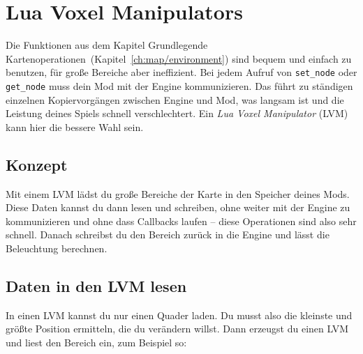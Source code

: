 \chapter{Lua Voxel Manipulators}
\label{ch:advmap/lvm}

Die Funktionen aus dem Kapitel Grundlegende
Kartenoperationen~(Kapitel~\ref{ch:map/environment}) sind bequem und
einfach zu benutzen, für große Bereiche aber ineffizient. Bei jedem
Aufruf von \texttt{set\_\allowbreak{}node} oder
\texttt{get\_\allowbreak{}node} muss dein Mod mit der Engine
kommunizieren. Das führt zu ständigen einzelnen Kopiervorgängen zwischen
Engine und Mod, was langsam ist und die Leistung deines Spiels schnell
verschlechtert. Ein \emph{Lua Voxel Manipulator} (LVM)
kann hier die bessere Wahl sein.

\section{Konzept}\label{konzept}

Mit einem LVM lädst du große Bereiche der Karte in den Speicher deines
Mods. Diese Daten kannst du dann lesen und schreiben, ohne weiter mit
der Engine zu kommunizieren und ohne dass
Callbacks laufen -- diese Operationen sind also
sehr schnell. Danach schreibst du den Bereich zurück in die Engine und
lässt die Beleuchtung berechnen.

\section{Daten in den LVM lesen}\label{daten-in-den-lvm-lesen}

In einen LVM kannst du nur einen Quader laden. Du musst also die
kleinste und größte Position ermitteln, die du verändern willst. Dann
erzeugst du einen LVM und liest den Bereich ein, zum Beispiel so:

\begin{Shaded}
\begin{Highlighting}[]
  \OperatorTok{=} \OperatorTok{()}
 \OperatorTok{,}  \OperatorTok{=} \OperatorTok{:}\OperatorTok{(}\OperatorTok{,} \OperatorTok{)}
\end{Highlighting}
\end{Shaded}


